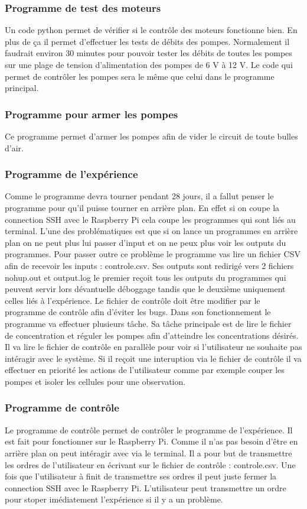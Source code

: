 \documentclass[a4paper, 11pt]{article}
\begin{document}
\subsubsection{Programme de test des moteurs}
Un code python permet de vérifier si le contrôle des moteurs fonctionne bien.
En plus de ça il permet d'effectuer les tests de débits des pompes.
Normalement il faudrait environ 30 minutes pour pouvoir tester les débits de toutes les pompes sur une plage de tension d'alimentation des pompes de 6 V à 12 V.
Le code qui permet de contrôler les pompes sera le même que celui dans le programme principal.
\subsubsection{Programme pour armer les pompes}
Ce programme permet d'armer les pompes afin de vider le circuit de toute bulles d'air.
\subsubsection{Programme de l'expérience}
Comme le programme devra tourner pendant 28 jours, il a fallut penser le programme pour qu'il puisse tourner en arrière plan. En effet si on coupe la connection SSH avec le Raspberry Pi cela coupe les programmes qui sont liés au terminal.
L'une des problématiques est que si on lance un programmes en arrière plan on ne peut plus lui passer d'input et on ne peux plus voir les outputs du programmes.
Pour passer outre ce problème le programme vas lire un fichier CSV afin de recevoir les inputs : controle.csv.
Ses outputs sont redirigé vers 2 fichiers nohup.out et output.log le premier reçoit tous les outputs du programmes qui peuvent servir lors dévantuelle déboggage tandis que le deuxième uniquement celles liés à l'expérience.
Le fichier de contrôle doit être modifier par le programme de contrôle afin d'éviter les bugs.
Dans son fonctionnement le programme va effectuer plusieurs tâche. Sa tâche principale est de lire le fichier de concentration et réguler les pompes afin d'atteindre les concentrations désirés.
Il va lire le fichier de contrôle en parallèle pour voir si l'utilisateur ne souhaite pas intéragir avec le système.
Si il reçoit une interuption via le fichier de contrôle il va effectuer en priorité les actions de l'utilisateur comme par exemple couper les pompes et isoler les cellules pour une observation.
\subsubsection{Programme de contrôle}
Le programme de contrôle permet de contrôler le programme de l'expérience. Il est fait pour fonctionner sur le Raspberry Pi.
Comme il n'as pas besoin d'être en arrière plan on peut intéragir avec via le terminal.
Il a pour but de transmettre les ordres de l'utilisateur en écrivant sur le fichier de contrôle : controle.csv.
Une fois que l'utilisateur à finit de transmettre ses ordres il peut juste fermer la connection SSH avec le Raspberry Pi.
L'utilisateur peut transmettre un ordre pour stoper imédiatement l'expérience si il y a un problème.
\end{document}
